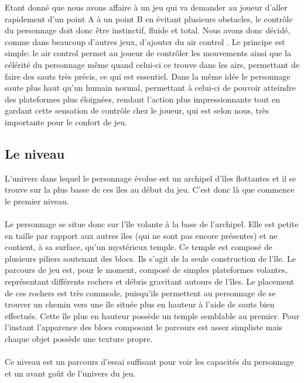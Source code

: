 \documentclass[a4paper]{article}
\begin{document}
Etant donné que nous avons affaire à un jeu qui va demander au joueur d’aller rapidement d'un point A à un point B en évitant plusieurs obstacles, le contrôle du personnage doit donc être instinctif, fluide et total. Nous avons donc décidé, comme dans beaucoup d'autres jeux, d'ajouter du \og air control \fg {}. Le principe est simple: le  \og air control \fg {} permet au joueur de contrôler les mouvements ainsi que la célérité du personnage même quand celui-ci ce trouve dans les airs, permettant de faire des sauts très précis, ce qui est essentiel. Dans la même idée le personnage saute plus haut qu'un humain normal, permettant à celui-ci de pouvoir atteindre des plateformes plus éloignées, rendant l'action plus impressionnante tout en gardant cette sensation de contrôle chez le joueur, qui est selon nous, très importante pour le confort de jeu.

\pagebreak

\subsection{Le niveau}
\vspace{0.5 cm}

L'univers dans lequel le personnage évolue est un archipel d'îles flottantes et il se trouve sur la plus basse de ces îles au début du jeu. C'est donc là que commence le premier niveau.\\
\\
 Le personnage se situe donc sur l'île volante à la base de l'archipel. Elle est petite en taille par rapport aux autres îles (qui ne sont pas encore présentes) et ne contient, à sa surface, qu'un mystérieux temple. Ce temple est composé de plusieurs piliers soutenant des blocs. Ils s'agit de la seule construction de l'île.
Le parcours de jeu est, pour le moment, composé de simples plateformes volantes, représentant différents rochers et débris gravitant autours de  l'îles. Le placement de ces rochers est très commode, puisqu'ils permettent au personnage de se trouver un chemin vers une île située plus en hauteur à l'aide de sauts bien effectués. Cette île plus en hauteur possède un temple semblable au premier.
Pour l'instant l'apparence des blocs composant le parcours est assez simpliste mais chaque objet possède une texture propre.\\
\\
Ce niveau est un parcours d'essai suffisant pour voir les capacités du personnage et un avant goût de l’univers du jeu.\\
\\
\\
\\
\end{document}
